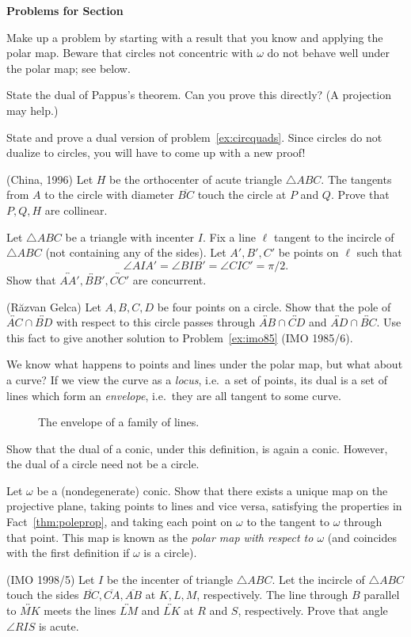 \documentclass[12pt]{book}
\newcounter{exc}
\numberwithin{exc}{section}
\numberwithin{figure}{section}
\newenvironment{exer}{\vspace{0.1in}
\noindent \textbf{Problems for Section~\thesection} \vspace{0.1in}
\begin{list}{\arabic{exc}.}{\usecounter{exc}}}{\end{list}}
\numberwithin{equation}{theorem}
\def\ii{\item}
\def\line#1{\overleftrightarrow{#1}}
\def\seg#1{\overline{#1}}
\begin{document}
\begin{exer}
\ii
Make up a problem by starting with a result that you know and 
applying the polar map. Beware that circles not concentric with $\omega$ 
do not behave well under the polar map; see below.
\ii
State the dual of Pappus's theorem. 
Can you prove this directly? (A 
projection may help.)
\ii
State and prove a dual version of problem~\ref{ex:circquads}. Since circles do 
not dualize to circles, you will have to come up with a new proof!
\ii (China, 1996)
Let $H$ be the orthocenter of acute triangle $\triangle ABC$. The tangents 
from $A$ to the circle with diameter $\seg{BC}$ touch the circle at $P$ 
and $Q$. Prove that $P, Q, H$ are collinear.
\ii
Let $\triangle 
ABC$ be a triangle with incenter $I$. Fix a line $\ell$ tangent 
to the incircle of $\triangle ABC$ (not containing any of the sides).
Let $A', B', C'$ be points on $\ell$ such that
\[
\angle AIA' = \angle BIB' = \angle CIC' = \pi/2.
\]
Show that $\line{AA'}, \line{BB}', \line{CC'}$ are concurrent.
\ii \label{ex:imo852} (R\u{a}zvan Gelca) 
Let $A, B, C, D$ be four points on a circle. Show that the pole of $\line{AC}
\cap \line{BD}$ with respect to this circle passes through $\line{AB} \cap 
\line{CD}$ and
$\line{AD} \cap \line{BC}$. Use this fact to give another solution to 
Problem~\ref{ex:imo85} (IMO
1985/6).

\ii
We know what happens to points and lines under the polar map, but 
what about a curve? If we view the curve as a \emph{locus},
 i.e.\ a 
set of points, its dual is a set of lines which form an \emph{envelope}, 
i.e.\ they are all tangent to some curve. 
\begin{figure}[ht]
\caption{The envelope of a family of lines.}
\end{figure}
Show that the dual of a conic, under this definition, is again a 
conic. However, the dual of a circle need not be a circle.
\ii
Let $\omega$ be a (nondegenerate) conic.  Show that there exists a 
unique map on the projective plane, taking points to lines and vice 
versa, satisfying the properties in Fact~\ref{thm:poleprop}, and 
taking each point on $\omega$ to the tangent to $\omega$ through that 
point. This map is known as the \emph{polar map with respect to 
$\omega$} 
(and coincides with the first definition if $\omega$ is a 
circle).
\ii (IMO 1998/5)
Let $I$ be the incenter of triangle $\triangle ABC$.  Let the incircle of 
$\triangle ABC$
touch the sides $\seg{BC}, \seg{CA}, \seg{AB}$ at $K, L, M$,
respectively.  The line through $B$ parallel to $\line{MK}$ meets the lines
$\line{LM}$ and $\line{LK}$ at $R$ and $S$, respectively.  
Prove that angle $\angle RIS$ is acute.
\end{exer}
\end{document}
